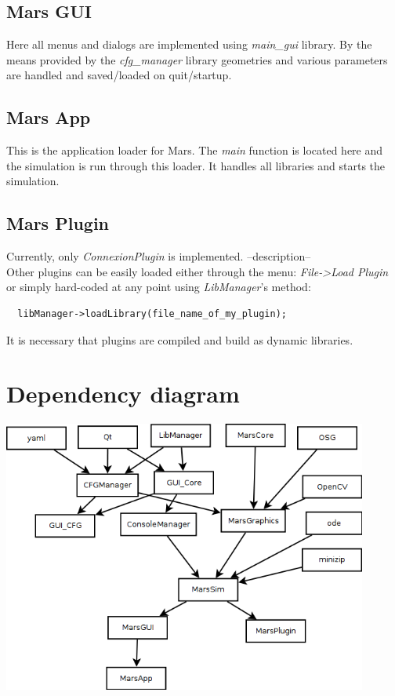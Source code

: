 \documentclass{article}
\begin{document}
\subsection{Mars GUI}

Here all menus and dialogs are implemented using \emph{main\_gui} library. By the means provided by the 
\emph{cfg\_manager} library geometries and various parameters are handled and saved/loaded on quit/startup.


\subsection{Mars App}

This is the application loader for Mars. The \emph{main} function is located here and the simulation is
run through this loader. It handles all libraries and starts the simulation.


\subsection{Mars Plugin}

Currently, only \emph{ConnexionPlugin} is implemented. --description-- \\

Other plugins can be easily loaded either through the menu: \emph{File->Load Plugin} or simply hard-coded
at any point using \emph{LibManager}'s method:

\begin{lstlisting}
  libManager->loadLibrary(file_name_of_my_plugin);
\end{lstlisting}

It is necessary that plugins are compiled and build as dynamic libraries.




\section{Dependency diagram}

\includegraphics[width=120mm]{Diagram1.png}
\end{document}
